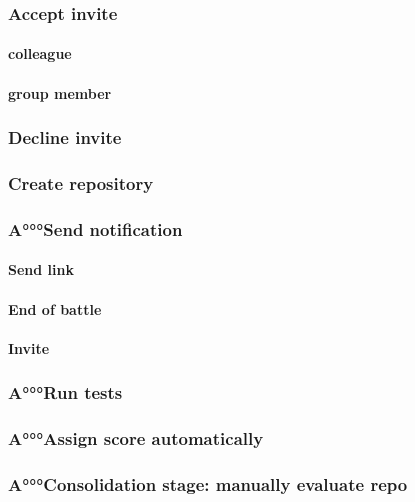 \documentclass{article}
\begin{document}
            \subsubsection{Accept invite}
                \paragraph*{colleague}

                \paragraph*{group member}
            \subsubsection{Decline invite}
            \subsubsection{Create repository}
            \subsubsection{A°°°Send notification}
                \paragraph*{Send link}
                \paragraph*{End of battle}
                \paragraph*{Invite}
            \subsubsection{A°°°Run tests}
            \subsubsection{A°°°Assign score automatically}
            \subsubsection{A°°°Consolidation stage: manually evaluate repo}
\end{document}
